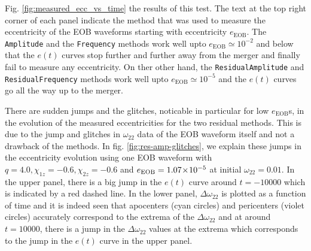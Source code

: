 \documentclass[aps,prd,amsmath,floats,floatfix, twocolumn,
superscriptaddress,nofootinbib,showpacs]{revtex4-1}
\newcommand{\into}{\!\times\!\relax} %
\newcommand{\eEOB}{e_{\text{EOB}}}
\newcommand{\mAmp}{\texttt{Amplitude}}
\newcommand{\mFreq}{\texttt{Frequency}}
\newcommand{\mResAmp}{\texttt{ResidualAmplitude}}
\newcommand{\mResFreq}{\texttt{ResidualFrequency}}
\newcommand{\resOmega}{\Delta \omega_{22}}
\begin{document}
Fig. \ref{fig:measured_ecc_vs_time} the results of this test. The text
at the top right corner of each panel indicate the method that was
used to measure the eccentricity of the EOB waveforms starting with
eccentricity $\eEOB$. The \mAmp{} and the
\mFreq{} methods work well upto $\eEOB \simeq
10^{-2}$ and below that the $e(t)$ curves stop further and further
away from the merger and finally fail to measure any eccentricity. On
ther other hand, the \mResAmp{} and
\mResFreq{} methods work well upto $\eEOB
\simeq 10^{-5}$ and the $e(t)$ curves go all the way up to the
merger.

There are sudden jumps and the glitches, noticable in
particular for low $\eEOB$s, in the evolution of the measured
eccentricities for the two residual methods.  This is due to the jump
and glitches in $\omega_{22}$ data of the EOB waveform itself and not
a drawback of the methods. In fig. \ref{fig:res-amp-glitches}, we
explain these jumps in the eccentricity evolution using one EOB
waveform with $q=4.0, \chi_{1z}=-0.6, \chi_{2z}=-0.6$ and $\eEOB=1.07
\into 10^{-5}$ at initial $\omega_{22} = 0.01$. In the upper panel,
there is a big jump in
the $e(t)$ curve around $t=-10000$ which is indicated by a red dashed
line. In the lower panel, $\resOmega$ is plotted as a function of time
and it is indeed seen that apocenters (cyan circles) and pericenters
(violet circles) accurately correspond to the extrema of the
$\resOmega$ and at around $t=10000$, there is a jump in the
$\resOmega$ values at the extrema which corresponds to the jump in the
$e(t)$ curve in the upper panel.
\end{document}
